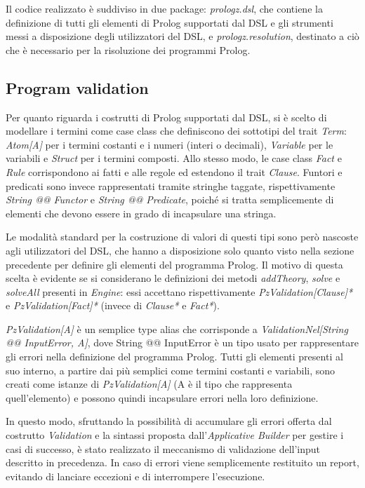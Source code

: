 Il codice realizzato è suddiviso in due package: \textit{prologz.dsl}, che contiene la definizione di tutti gli elementi di Prolog supportati dal DSL e gli strumenti messi a disposizione degli utilizzatori del DSL, e \textit{prologz.resolution}, destinato a ciò che è necessario per la risoluzione dei programmi Prolog.

\subsection{Program validation}

Per quanto riguarda i costrutti di Prolog supportati dal DSL, si è scelto di modellare i termini come case class che definiscono dei sottotipi del trait \textit{Term}: \textit{Atom[A]} per i termini costanti e i numeri (interi o decimali), \textit{Variable} per le variabili e \textit{Struct} per i termini composti. Allo stesso modo, le case class \textit{Fact} e \textit{Rule} corrispondono ai fatti e alle regole ed estendono il trait \textit{Clause}. Funtori e predicati sono invece rappresentati tramite stringhe taggate, rispettivamente \textit{String @@ Functor} e \textit{String @@ Predicate}, poiché si tratta semplicemente di elementi che devono essere in grado di incapsulare una stringa.

Le modalità standard per la costruzione di valori di questi tipi sono però nascoste agli utilizzatori del DSL, che hanno a disposizione solo quanto visto nella sezione precedente per definire gli elementi del programma Prolog. Il motivo di questa scelta è evidente se si considerano le definizioni dei metodi \textit{addTheory}, \textit{solve} e \textit{solveAll} presenti in \textit{Engine}: essi accettano rispettivamente \textit{PzValidation[Clause]*} e \textit{PzValidation[Fact]*} (invece di \textit{Clause*} e \textit{Fact*}).

\textit{PzValidation[A]} è un semplice type alias che corrisponde a \textit{ValidationNel[String @@ InputError, A]}, dove String @@ InputError è un tipo usato per rappresentare gli errori nella definizione del programma Prolog. Tutti gli elementi presenti al suo interno, a partire dai più semplici come termini costanti e variabili, sono creati come istanze di \textit{PzValidation[A]} (A è il tipo che rappresenta quell'elemento) e possono quindi incapsulare errori nella loro definizione.

In questo modo, sfruttando la possibilità di accumulare gli errori offerta dal costrutto \textit{Validation} e la sintassi proposta dall'\textit{Applicative Builder} per gestire i casi di successo, è stato realizzato il meccanismo di validazione dell'input descritto in precedenza. In caso di errori viene semplicemente restituito un report, evitando di lanciare eccezioni e di interrompere l'esecuzione.

